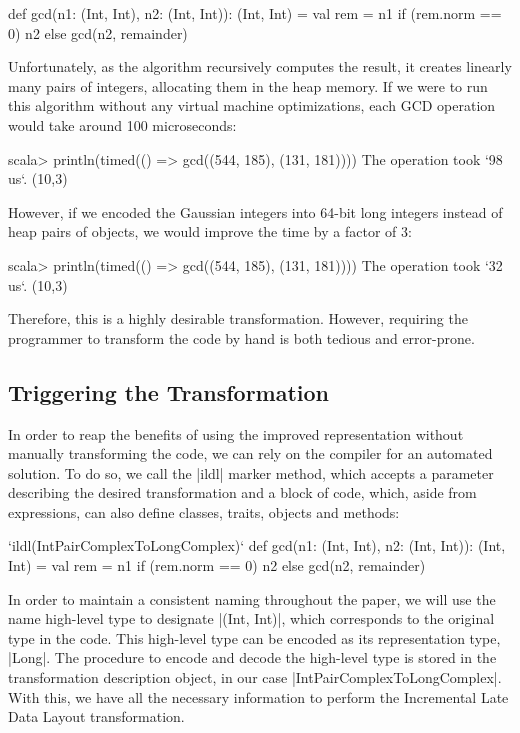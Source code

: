 \begin{lstlisting-nobreak}
def gcd(n1: (Int, Int), n2: (Int, Int)): (Int, Int) = {
  val rem = n1 %
  if (rem.norm == 0) n2 else gcd(n2, remainder)
}
\end{lstlisting-nobreak}

Unfortunately, as the algorithm recursively computes the result, it creates linearly many pairs of integers, allocating them in the heap memory. If we were to run this algorithm without any virtual machine optimizations, each GCD operation would take around 100 microseconds:

\begin{lstlisting-nobreak}
scala>   println(timed(() => gcd((544, 185), (131, 181))))
The operation took `98 us`.
(10,3)
\end{lstlisting-nobreak}

However, if we encoded the Gaussian integers into 64-bit long integers instead of heap pairs of objects, we would improve the time by a factor of 3:

\begin{lstlisting-nobreak}
scala> println(timed(() => gcd((544, 185), (131, 181))))
The operation took `32 us`.
(10,3)
\end{lstlisting-nobreak}

Therefore, this is a highly desirable transformation. However, requiring the programmer to transform the code by hand is both tedious and error-prone.

\subsection{Triggering the Transformation}

In order to reap the benefits of using the improved representation without manually transforming the code, we can rely on the compiler for an automated solution. To do so, we call the |ildl| marker method, which accepts a parameter describing the desired transformation and a block of code, which, aside from expressions, can also define classes, traits, objects and methods:

\begin{lstlisting-nobreak}
`ildl(IntPairComplexToLongComplex)` {
  def gcd(n1: (Int, Int), n2: (Int, Int)): (Int, Int) = {
    val rem = n1 %
    if (rem.norm == 0) n2 else gcd(n2, remainder)
  }
}
\end{lstlisting-nobreak}

In order to maintain a consistent naming throughout the paper, we will use the name high-level type to designate |(Int, Int)|, which corresponds to the original type in the code. This high-level type can be encoded as its representation type, |Long|. The procedure to encode and decode the high-level type is stored in the transformation description object, in our case |IntPairComplexToLongComplex|. With this, we have all the necessary information to perform the Incremental Late Data Layout transformation.

